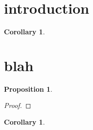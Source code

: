 \documentclass[10pt, reqno]{amsart}
\theoremstyle{plain}
\newtheorem{maincorollary}[maintheorem]{Corollary}
\newtheorem{proposition}[theorem]{Proposition}
\newtheorem{corollary}[theorem]{Corollary}
\theoremstyle{definition}
\begin{document}
\maketitle

\begin{abstract} 
\end{abstract} 

\section{introduction}

\begin{maincorollary}
\end{maincorollary}


\section{blah}


\begin{proposition}
\end{proposition}

\begin{proof}
\end{proof}

\begin{corollary}
\end{corollary}

{}

\end{document}
